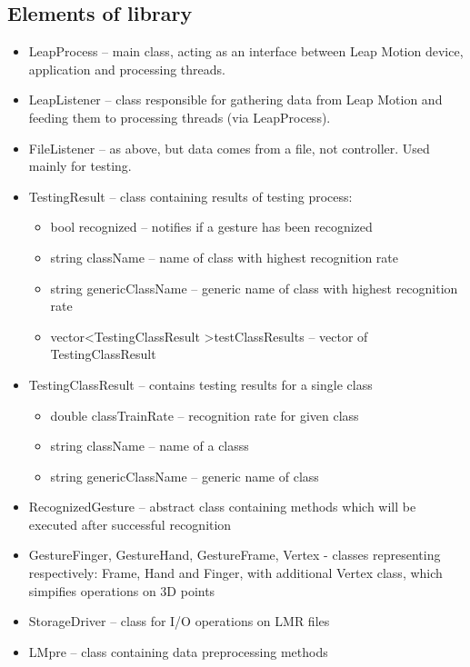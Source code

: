 \subsection{Elements of library}
\begin{itemize}
\item LeapProcess -- main class, acting as an interface between Leap Motion device, application and processing threads.
\item LeapListener -- class responsible for gathering data from Leap Motion and feeding them to processing threads (via LeapProcess).
\item FileListener -- as above, but data comes from a file, not controller. Used mainly for testing.
\item TestingResult -- class containing results of testing process:
\begin{itemize}
	\item bool recognized -- notifies if a gesture has been recognized
	\item string className -- name of class with highest recognition rate
	\item string genericClassName -- generic name of class with highest recognition rate
	\item vector\textless TestingClassResult \textgreater testClassResults -- vector of TestingClassResult
\end{itemize}
\item TestingClassResult -- contains testing results for a single class
\begin{itemize}
	\item double classTrainRate -- recognition rate for given class
	\item string className -- name of a classs
	\item string genericClassName -- generic name of class
\end{itemize}

\item RecognizedGesture -- abstract class containing methods which will be executed after successful recognition
\item GestureFinger, GestureHand, GestureFrame, Vertex - classes representing respectively: Frame, Hand and Finger, with additional Vertex class, which simpifies operations on 3D points
\item StorageDriver -- class for I/O operations on LMR files
\item LMpre -- class containing data preprocessing methods

\end{itemize}

